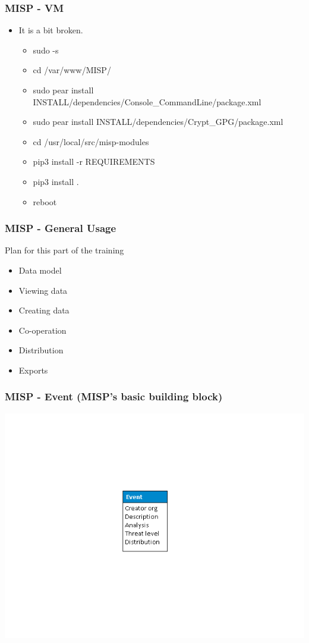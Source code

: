 \begin{frame}
    \frametitle{MISP - VM}
    \begin{itemize}
    \item It is a bit broken.
        \begin{itemize}
            \item sudo -s
            \item cd /var/www/MISP/
            \item sudo pear install INSTALL/dependencies/Console\_CommandLine/package.xml
            \item sudo pear install INSTALL/dependencies/Crypt\_GPG/package.xml
            \item cd /usr/local/src/misp-modules
            \item pip3 install -r REQUIREMENTS
            \item pip3 install .
            \item reboot
        \end{itemize}
    \end{itemize}
\end{frame}

\begin{frame}
    \frametitle{MISP - General Usage}
    Plan for this part of the training
        \begin{itemize}
            \item Data model
            \item Viewing data
            \item Creating data
            \item Co-operation
            \item Distribution
            \item Exports
        \end{itemize}
\end{frame}

\begin{frame}
    \frametitle{MISP - Event (MISP's basic building block)}
    \includegraphics[scale=0.45]{screenshots/datamodel1.png}
\end{frame}

